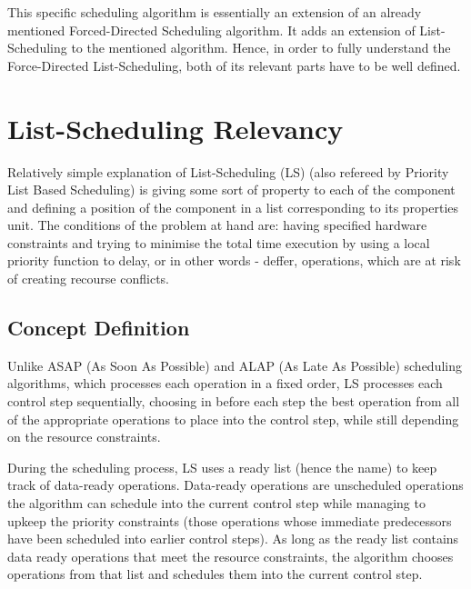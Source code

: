 \documentclass[conference]{IEEEtran}
\begin{document}
This specific scheduling algorithm is essentially an extension of an already mentioned Forced-Directed Scheduling algorithm. It adds an extension of List-Scheduling to the mentioned algorithm. Hence, in order to fully understand the Force-Directed List-Scheduling, both of its relevant parts have to be well defined.

\section{List-Scheduling Relevancy}

Relatively simple explanation of List-Scheduling (LS) \cite{b3} (also refereed by Priority List Based Scheduling) is giving some sort of property to each of the component and defining a position of the component in a list corresponding to its properties unit. The conditions of the problem at hand are: having specified hardware constraints and trying to minimise the total time execution by using a local priority function to delay, or in other words - deffer, operations, which are at risk of creating recourse conflicts.

\subsection{Concept Definition}

Unlike ASAP (As Soon As Possible) and ALAP (As Late As Possible) scheduling algorithms, which processes each operation in a fixed order, LS processes each control step sequentially, choosing in before each step the best operation from all of the appropriate operations to place into the control step, while still depending on the resource constraints.

During the scheduling process, LS uses a ready list (hence the name) to keep track of data-ready operations. Data-ready operations are unscheduled operations the algorithm can schedule into the current control step while managing to upkeep the priority constraints (those operations whose immediate predecessors have been scheduled into earlier control steps). As long as the ready list contains data ready operations that meet the resource constraints, the algorithm chooses operations from that list and schedules them into the current control step. 
\end{document}
